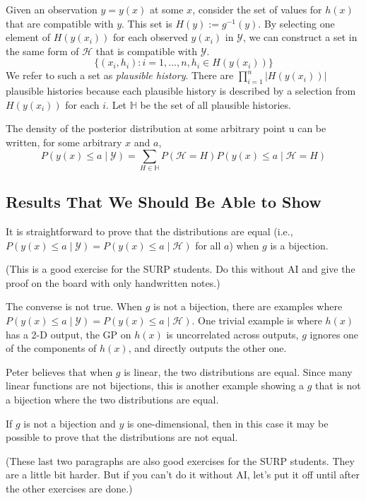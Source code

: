 \documentclass[11pt]{article}
\newcommand{\Y}{\mathcal{Y}}
\renewcommand{\H}{\mathcal{H}}
\newcommand{\Hset}{\mathbb{H}}
\begin{document}
Given an observation $y=y(x)$ at some $x$, consider the set of values for
$h(x)$ that are compatible with $y$. This set is $H(y) := g^{-1}(y)$.
By selecting one element of $H(y(x_i))$ for each observed $y(x_i)$ in $\Y$,
we can construct a set in the same form of $\H$ that is compatible with $\Y$.
\begin{equation}
\{ (x_i, h_i) : i=1,\ldots,n, h_i \in H(y(x_i)) \}
\end{equation}
We refer to such a set as {\it plausible history}.
There are $\prod_{i=1}^n |H(y(x_i))|$ plausible histories because each plausible history is described by a selection from $H(y(x_i))$ for each $i$.
Let $\Hset$ be the set of all plausible histories.

The density of the posterior distribution at some arbitrary point u can be written, for some arbitrary $x$ and $a$,
\begin{equation*}
P(y(x) \le a \mid \Y) = \sum_{H \in \Hset} P(\H = H) P(y(x) \le a \mid \H = H)
\end{equation*}



\subsection{Results That We Should Be Able to Show}

It is straightforward to prove that the distributions are equal (i.e., 
$P(y(x) \le a \mid \Y) = P(y(x) \le a \mid \H)$
for all $a$) when $g$ is a bijection.

(This is a good exercise for the SURP students. Do this without AI and give the
proof on the board with only handwritten notes.)

The converse is not true. When $g$ is not a bijection, there are examples where
$P(y(x) \le a \mid \Y) = P(y(x) \le a \mid \H)$.  One trivial example is where
$h(x)$ has a 2-D output, the GP on $h(x)$ is uncorrelated across outputs, $g$
ignores one of the components of $h(x)$, and directly outputs the other one.

Peter believes that when $g$ is linear, the two distributions are equal.
Since many linear functions are not bijections, this is another example showing
a $g$ that is not a bijection where the two distributions are equal.

If $g$ is not a bijection and $y$ is one-dimensional, then in this case it may
be possible to prove that the distributions are not equal.

(These last two paragraphs are also good exercises for the SURP students. They are a little bit harder. But if you can't do it without AI, let's put it off until after the other exercises are done.)
\end{document}
